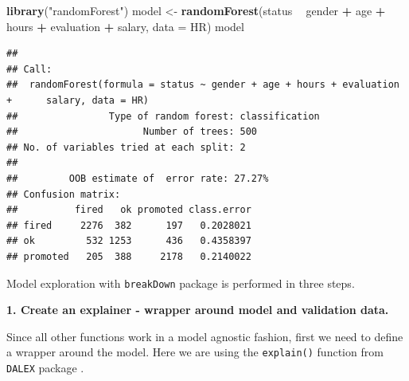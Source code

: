 \documentclass[]{book}
\newenvironment{Shaded}{\begin{snugshade}}{\end{snugshade}}
\newcommand{\ControlFlowTok}[1]{\textcolor[rgb]{0.13,0.29,0.53}{\textbf{#1}}}
\newcommand{\DataTypeTok}[1]{\textcolor[rgb]{0.13,0.29,0.53}{#1}}
\newcommand{\DecValTok}[1]{\textcolor[rgb]{0.00,0.00,0.81}{#1}}
\newcommand{\KeywordTok}[1]{\textcolor[rgb]{0.13,0.29,0.53}{\textbf{#1}}}
\newcommand{\NormalTok}[1]{#1}
\newcommand{\OperatorTok}[1]{\textcolor[rgb]{0.81,0.36,0.00}{\textbf{#1}}}
\newcommand{\StringTok}[1]{\textcolor[rgb]{0.31,0.60,0.02}{#1}}
\theoremstyle{definition}
\theoremstyle{definition}
\theoremstyle{definition}
\theoremstyle{remark}
\begin{document}
\begin{Shaded}
\begin{Highlighting}[]
\KeywordTok{library}\NormalTok{(}\StringTok{"randomForest"}\NormalTok{)}
\NormalTok{model <-}\StringTok{ }\KeywordTok{randomForest}\NormalTok{(status }\OperatorTok{~}\StringTok{ }\NormalTok{gender }\OperatorTok{+}\StringTok{ }\NormalTok{age }\OperatorTok{+}\StringTok{ }\NormalTok{hours }\OperatorTok{+}\StringTok{ }\NormalTok{evaluation }\OperatorTok{+}\StringTok{ }\NormalTok{salary, }\DataTypeTok{data =}\NormalTok{ HR)}
\NormalTok{model}
\end{Highlighting}
\end{Shaded}

\begin{verbatim}
## 
## Call:
##  randomForest(formula = status ~ gender + age + hours + evaluation +      salary, data = HR) 
##                Type of random forest: classification
##                      Number of trees: 500
## No. of variables tried at each split: 2
## 
##         OOB estimate of  error rate: 27.27%
## Confusion matrix:
##          fired   ok promoted class.error
## fired     2276  382      197   0.2028021
## ok         532 1253      436   0.4358397
## promoted   205  388     2178   0.2140022
\end{verbatim}

Model exploration with \texttt{breakDown} package is performed in three
steps.

\textbf{1. Create an explainer - wrapper around model and validation
data.}

Since all other functions work in a model agnostic fashion, first we
need to define a wrapper around the model. Here we are using the
\texttt{explain()} function from \texttt{DALEX} package \citep{R-DALEX}.

\begin{Shaded}
\end{Shaded}
\end{document}

